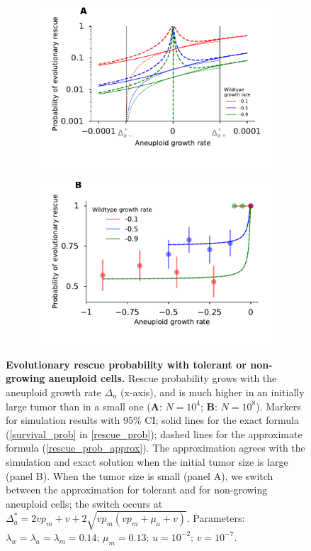 \documentclass[12pt]{extarticle}
\begin{document}
\begin{figure}
\begin{subfigure}{0.5\textwidth}
\includegraphics[width=1\textwidth]{Figures/P_est_divergence.pdf}
\end{subfigure}
\begin{subfigure}{0.5\textwidth}
\includegraphics[width=1\textwidth]{Figures/P_est_divergenceLargePopulation.pdf}
\end{subfigure}
\caption{\textbf{Evolutionary rescue probability with tolerant or non-growing aneuploid cells.}
Rescue probability grows with the aneuploid growth rate $\Delta_a$ (x-axis), and is much higher in an initially large tumor than in a small one (\textbf{A}: $N=10^4$; \textbf{B}: $N=10^8$). 
Markers for simulation results with 95\% CI; 
solid lines for the exact formula (\cref{survival_prob} in \cref{rescue_prob});
dashed lines for the approximate formula (\cref{rescue_prob_approx}).
The approximation agrees with the simulation and exact solution when the initial tumor size is large (panel B).
When the tumor size is small (panel A), we switch between the approximation for tolerant and for non-growing aneuploid cells; the switch occurs at $\Delta_a^*=2vp_m+v+2\sqrt{vp_m\left(vp_m+\mu_a+v\right)}$.
Parameters: $\lambda_w=\lambda_a=\lambda_m=0.14$; $\mu_m=0.13$; $u=10^{-2}$; $v=10^{-7}$.
}
\label{rescue_prob_an_growth}
\end{figure}
\end{document}
